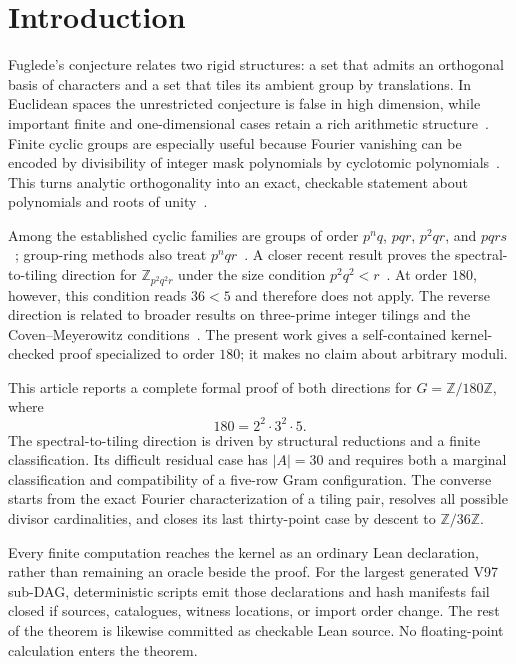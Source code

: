 \documentclass[10pt,twocolumn]{article}
\theoremstyle{definition}
\theoremstyle{remark}
\newcommand{\Z}{\mathbb Z}
\newcommand{\Zmod}[1]{\Z/#1\Z}
\begin{document}
\section{Introduction}

Fuglede's conjecture relates two rigid structures: a set that admits an
orthogonal basis of characters and a set that tiles its ambient group by
translations.  In Euclidean spaces the unrestricted conjecture is false in
high dimension, while important finite and one-dimensional cases retain a
rich arithmetic structure~\cite{Fuglede1974,Tao2004,DutkayLai2014}.  Finite
cyclic groups are especially useful because Fourier vanishing can be encoded
by divisibility of integer mask polynomials by cyclotomic
polynomials~\cite{CovenMeyerowitz1999}.  This
turns analytic orthogonality into an exact, checkable statement about
polynomials and roots of unity~\cite{LamLeung2000,Malikiosis2022}.

Among the established cyclic families are groups of order $p^nq$, $pqr$,
$p^2qr$, and $pqrs$~\cite{MalikiosisKolountzakis2017,Shi2019,Somlai2023,
KissMalikiosisSomlaiVizer2022}; group-ring methods also treat
$p^nqr$~\cite{Zhang2022}.  A closer recent result proves the
spectral-to-tiling direction for $\Z_{p^2q^2r}$ under the size condition
$p^2q^2<r$~\cite{FallonKissMayeliSomlai2026}.  At order $180$, however,
this condition reads $36<5$ and therefore does not apply.  The reverse
direction is related to broader results on three-prime integer tilings and
the Coven--Meyerowitz conditions~\cite{LabaLondnerEven2024}.  The present
work gives a self-contained kernel-checked proof specialized to order $180$;
it makes no claim about arbitrary moduli.

This article reports a complete formal proof of both directions for
$G=\Zmod{180}$, where
\[
180=2^2\cdot 3^2\cdot 5.
\]
The spectral-to-tiling direction is driven by structural reductions and a
finite classification.  Its difficult residual case has $|A|=30$ and
requires both a marginal classification and compatibility of a five-row Gram
configuration.  The converse starts from the exact Fourier characterization
of a tiling pair, resolves all possible divisor cardinalities, and closes its
last thirty-point case by descent to $\Zmod{36}$.

Every finite computation reaches the kernel as an ordinary Lean declaration,
rather than remaining an oracle beside the proof.  For the largest generated
V97 sub-DAG, deterministic scripts emit those declarations and hash manifests
fail closed if sources, catalogues, witness locations, or import order change.
The rest of the theorem is likewise committed as checkable Lean source.  No
floating-point calculation enters the theorem.
\end{document}
